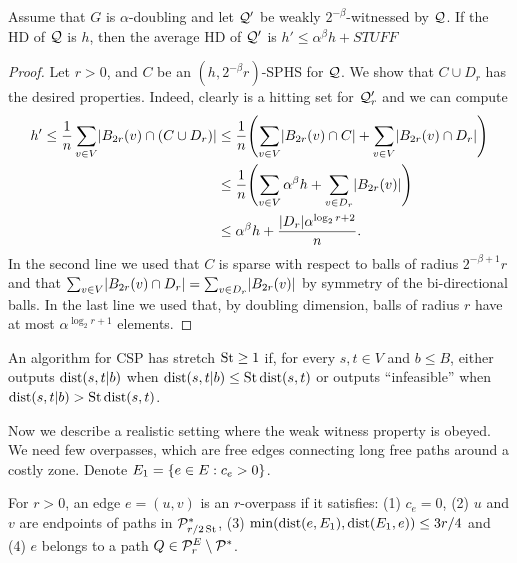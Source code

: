 \documentclass[letterpaper,11pt]{article}
\begin{document}
\begin{proposition}
Assume that $G$ is $\alpha$-doubling and let $\mathcal{Q}'$ be weakly $2^{-\beta}$-witnessed by $\mathcal{Q}$.
If the HD of $\mathcal{Q}$ is $h$, then the average HD of $\mathcal{Q}'$ is $h'\leq \alpha^{\beta}h+STUFF$
\end{proposition}
\begin{proof}
Let $r>0$, and $C$ be an $(h,2^{-\beta}r)$-SPHS for $\mathcal{Q}$.
We show that $C\cup D_r$ has the desired properties.
Indeed, clearly is a hitting set for $\mathcal{Q}'_r$ and we can compute
\begin{align*}
h'\leq \frac{1}{n}\sum_{v\in V} \abs{B_{2r}(v)\cap (C\cup D_r)}
&\leq \frac{1}{n}\prn*{\sum_{v\in V} \abs{B_{2r}(v)\cap C}+\sum_{v\in V} \abs{B_{2r}(v)\cap D_r}}\\
&\leq \frac{1}{n}\prn*{\sum_{v\in V} \alpha^\beta h+\sum_{v\in D_r} \abs{B_{2r}(v)}}\\
&\leq \alpha^\beta h + \frac{\abs{D_r}\alpha^{\log_2r+2}}{n}.
\end{align*}
In the second line we used that $C$ is sparse with respect to balls of radius $2^{-\beta+1}r$ and that $\sum_{v\in V} \lvert B_{2r}(v)\cap D_r\rvert=\sum_{v\in D_r} \lvert B_{2r}(v)\rvert$ by symmetry of the bi-directional balls.
In the last line we used that, by doubling dimension, balls of radius $r$ have at most $\alpha^{\log_2r+1}$ elements.
\end{proof}

\begin{definition}[Stretch]
An algorithm for CSP has stretch $\operatorname{St}\geq 1$ if, for every $s,t\in V$ and $b\leq B$, either outputs $\mbox{dist}(s,t|b)$ when $\mbox{dist}(s,t|b)\leq \operatorname{St}\mbox{dist}(s,t)$ or outputs ``infeasible'' when $\mbox{dist}(s,t|b)>\operatorname{St}\mbox{dist}(s,t)$.
\end{definition}


Now we describe a realistic setting where the weak witness property is obeyed.
We need few overpasses, which are free edges connecting long free paths around a costly zone.
Denote $E_1=\{e\in E:c_e>0\}$.

\begin{definition}[Overpass]
For $r>0$, an edge $e=(u,v)$ is an $r$-overpass if it satisfies: (1) $c_e=0$, (2) $u$ and $v$ are endpoints of paths in $\mathcal{P}^*_{r/2\operatorname{St}}$, (3) $\min(\mbox{dist}(e,E_1),\mbox{dist}(E_1,e))\leq 3r/4$ and (4) $e$ belongs to a path $Q\in\mathcal{P}^E_r\setminus\mathcal{P}^*$.
\end{definition} 
\end{document}

